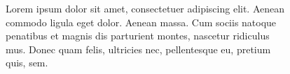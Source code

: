 \documentclass[blue, headsep]{subdocuments/open_science_poster}\usepackage{graphicx, color}
\newenvironment{knitrout}{}{} %
\begin{document}
\begin{frame}[t]
\begin{columns}[t]
\begin{column}{0.28\paperwidth}
			\begin{exampleblock}{}
				\begin{figure}[H] %
				\centering
				\caption{Lorem ipsum dolor sit amet, consectetuer adipiscing elit. Aenean
				commodo ligula eget dolor. Aenean massa. Cum sociis natoque penatibus et
				magnis dis parturient montes, nascetur ridiculus mus. Donec quam felis,
				ultricies nec, pellentesque eu, pretium quis, sem.}
				\label{fig:test_plot}
			\end{figure} %
		\end{exampleblock}

		\end{column}


	\begin{column}{0.28\paperwidth}


\end{column}
\end{columns}
\end{frame}
\end{document}
